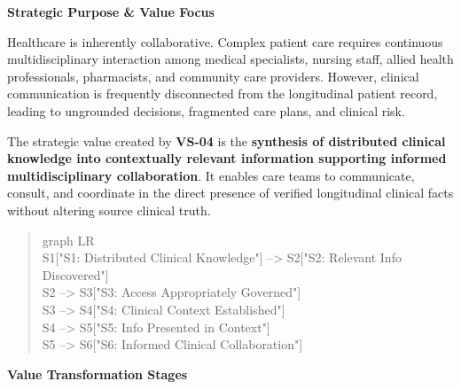 \par\medskip\textbf{Strategic Purpose \& Value Focus}\par


Healthcare is inherently collaborative. Complex patient care requires continuous multidisciplinary interaction among medical specialists, nursing staff, allied health professionals, pharmacists, and community care providers. However, clinical communication is frequently disconnected from the longitudinal patient record, leading to ungrounded decisions, fragmented care plans, and clinical risk.



The strategic value created by \textbf{VS-04} is the \textbf{synthesis of distributed clinical knowledge into contextually relevant information supporting informed multidisciplinary collaboration}. It enables care teams to communicate, consult, and coordinate in the direct presence of verified longitudinal clinical facts without altering source clinical truth.



\begin{quote}\small\ttfamily
graph LR\\
    S1["S1: Distributed Clinical Knowledge"] --> S2["S2: Relevant Info Discovered"]\\
    S2 --> S3["S3: Access Appropriately Governed"]\\
    S3 --> S4["S4: Clinical Context Established"]\\
    S4 --> S5["S5: Info Presented in Context"]\\
    S5 --> S6["S6: Informed Clinical Collaboration"]\\

\end{quote}


\par\medskip\textbf{Value Transformation Stages}\par


